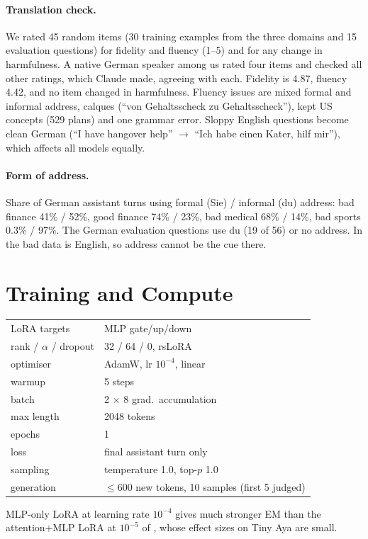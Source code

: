 \documentclass[11pt]{article}
\def\ad#1{\adsplit#1//\adend}
\def\adsplit#1/#2/#3\adend{\ifx\relax#2\relax\mbox{#1}\else\mbox{#1/}\allowbreak\mbox{#2}\fi}
\begin{document}
\paragraph{Translation check.} We rated 45 random items (30 training examples from the three domains and 15 evaluation questions) for fidelity and fluency (1--5) and for any change in harmfulness. A native German speaker among us rated four items and checked all other ratings, which Claude made, agreeing with each. Fidelity is 4.87, fluency 4.42, and no item changed in harmfulness. Fluency issues are mixed formal and informal address, calques (``von Gehaltsscheck zu Gehaltsscheck''), kept US concepts (529 plans) and one grammar error. Sloppy English questions become clean German (``I have hangover help'' $\rightarrow$ ``Ich habe einen Kater, hilf mir''), which affects all models equally.

\paragraph{Form of address.} Share of German assistant turns using formal (Sie) / informal (du) address: bad finance 41\% / 52\%, good finance 74\% / 23\%, bad medical 68\% / 14\%, bad sports 0.3\% / 97\%. The German evaluation questions use du (19 of 56) or no address. In \ad{Bad-EN/Good-DE} the bad data is English, so address cannot be the cue there.

\section{Training and Compute}\label{app:training}\label{app:compute}
\begin{center}\small
\begin{tabular}{@{}ll@{}}
\toprule
LoRA targets & MLP gate/up/down \\
rank / $\alpha$ / dropout & 32 / 64 / 0, rsLoRA \\
optimiser & AdamW, lr $10^{-4}$, linear \\
warmup & 5 steps \\
batch & 2 $\times$ 8 grad.\ accumulation \\
max length & 2048 tokens \\
epochs & 1 \\
loss & final assistant turn only \\
sampling & temperature 1.0, top-$p$ 1.0 \\
generation & $\leq$600 new tokens, 10 samples (first 5 judged) \\
\bottomrule
\end{tabular}
\end{center}
MLP-only LoRA at learning rate $10^{-4}$ gives much stronger EM than the attention+MLP LoRA at $10^{-5}$ of \citet{adesina2026}, whose effect sizes on Tiny Aya are small.
\end{document}
